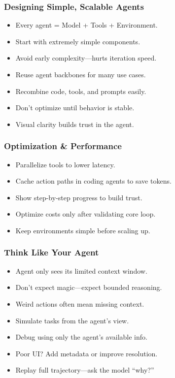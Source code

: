 \begin{frame}[fragile]\frametitle{Designing Simple, Scalable Agents}
    \begin{itemize}
        \item Every agent = Model + Tools + Environment.
        \item Start with extremely simple components.
        \item Avoid early complexity—hurts iteration speed.
        \item Reuse agent backbones for many use cases.
        \item Recombine code, tools, and prompts easily.
        \item Don’t optimize until behavior is stable.
        \item Visual clarity builds trust in the agent.
    \end{itemize}
\end{frame}

\begin{frame}[fragile]\frametitle{Optimization \& Performance}
    \begin{itemize}
        \item Parallelize tools to lower latency.
        \item Cache action paths in coding agents to save tokens.
        \item Show step-by-step progress to build trust.
        \item Optimize costs only after validating core loop.
        \item Keep environments simple before scaling up.
    \end{itemize}
\end{frame}

\begin{frame}[fragile]\frametitle{Think Like Your Agent}
    \begin{itemize}
        \item Agent only sees its limited context window.
        \item Don’t expect magic—expect bounded reasoning.
        \item Weird actions often mean missing context.
        \item Simulate tasks from the agent’s view.
        \item Debug using only the agent’s available info.
        \item Poor UI? Add metadata or improve resolution.
        \item Replay full trajectory—ask the model “why?”
    \end{itemize}
\end{frame}

